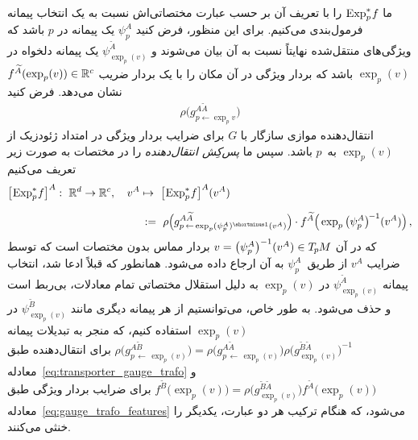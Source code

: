 ما $\operatorname{Exp}^*_p\mkern-2mu f$ را با تعریف آن بر حسب عبارت مختصاتی‌اش نسبت به یک انتخاب پیمانه فرمول‌بندی می‌کنیم.
برای این منظور، فرض کنید $\psi_p^A$ یک پیمانه در $p$ باشد که ویژگی‌های منتقل‌شده نهایتاً نسبت به آن بیان می‌شوند و $\psi_{\exp_p(v)}^{\widetilde{A}}$ یک پیمانه دلخواه در $\exp_p(v)$ باشد که بردار ویژگی در آن مکان را با یک بردار ضریب $f^{\widetilde{A}}(\exp_p(v)) \in \mathbb{R}^c$ نشان می‌دهد.
فرض کنید
\begin{align}
	\rho \big( g^{A\widetilde{A}}_{p\leftarrow\exp_p\!v} \big)
\end{align}
انتقال‌دهنده موازی سازگار با $G$ برای ضرایب بردار ویژگی در امتداد ژئودزیک از $\exp_p(v)$ به~$p$ باشد.
سپس ما \emph{پس‌کِش انتقال‌دهنده} را در مختصات به صورت زیر تعریف می‌کنیم
\begin{align}\label{eq:transporter_pullback_in_coords}
	\big[\mkern-2mu \Expspf \big]^A:\ \R^d \to \R^c,\quad v^A &\mapsto\ \big[\mkern-2mu \Expspf \big]^A (v^A)
	\notag \\[1.5ex]
	& \,:=\ 
	\rho\pig( g^{A\widetilde{A}}_{p \,\leftarrow\, \exp_p (\psi_p^A)^{\shortminus1}(v^A)} \pig) \cdot
	f^{\widetilde{A}} \pig( \exp_p \big(\psi_p^A\big)^{\mkern-2mu-1}(v^A) \pig) \,,
\end{align}
که در آن $v = \big(\psi_p^A\big)^{-1} (v^A) \in T_{\mkern-1.5mu p}\mkern-.5muM$ بردار مماس بدون مختصات است که توسط ضرایب $v^A$ از طریق~$\psi_p^A$ به آن ارجاع داده می‌شود.
همانطور که قبلاً ادعا شد، انتخاب پیمانه $\psi_{\exp_p(v)}^{\widetilde{A}}$ در $\exp_p(v)$ به دلیل استقلال مختصاتی تمام معادلات، بی‌ربط است و حذف می‌شود.
به طور خاص، می‌توانستیم از هر پیمانه دیگری مانند $\psi_{\exp_p(v)}^{\widetilde{B}}$ در $\exp_p(v)$ استفاده کنیم، که منجر به تبدیلات پیمانه
$
\rho\big( g^{A\widetilde{B}}_{p \,\leftarrow\, \exp_p(v)} \big)
= \rho\big( g^{A\widetilde{A}}_{p \,\leftarrow\, \exp_p(v)} \big)
\rho\big( g_{\exp_p(v)}^{\widetilde{B}\widetilde{A}} \big)^{-1}
$
برای انتقال‌دهنده طبق معادله~\eqref{eq:transporter_gauge_trafo} و
$
f^{\widetilde{B}} \big( \exp_p(v) \big)
= \rho\big( g_{\exp_p(v)}^{\widetilde{B}\widetilde{A}} \big)
f^{\widetilde{A}} \big( \exp_p(v) \big)
$
برای ضرایب بردار ویژگی طبق معادله~\eqref{eq:gauge_trafo_features} می‌شود، که هنگام ترکیب هر دو عبارت، یکدیگر را خنثی می‌کنند.

